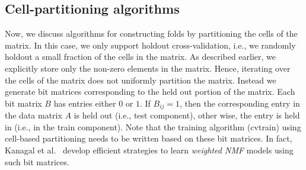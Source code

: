 \documentclass{vldb}
\begin{document}
\subsection{Cell-partitioning algorithms}
Now, we discuss algorithms for constructing folds by partitioning the cells of
the matrix. In this case, we only support holdout cross-validation, i.e., we
randomly holdout a small fraction of the cells in the matrix. As described
earlier, we explicitly store only the non-zero elements in the matrix. Hence,
iterating over the cells of the matrix does not uniformly partition the matrix.
Instead we generate bit matrices corresponding to the held out portion of the
matrix. Each bit matrix $B$ has entries either $0$ or $1$. If $B_{ij} = 1$, then
the corresponding entry in the data matrix $A$ is held out (i.e., test
component), other wise, the entry is held in (i.e., in the train component).
Note that the training algorithm (cvtrain) using cell-based partitioning needs
to be written based on these bit matrices. In fact, Kanagal et
al.~\cite{nips2010}
develop efficient strategies to learn {\em weighted NMF} models using such bit
matrices.
\end{document}
